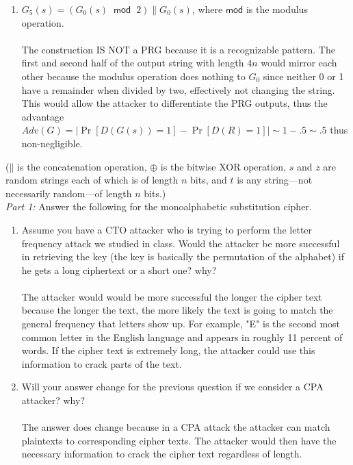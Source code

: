 \documentclass[12pt]{article}
\newcommand*\concat{\mathbin{\|}}
\begin{document}
\begin{enumerate}
\item $G_5(s) = (G_0(s) \;\; \mathsf{mod} \;\; 2) \concat G_0(s)$, where $\mathsf{mod}$ is the modulus operation.
\\\\The construction IS NOT a PRG because it is a recognizable pattern. The first and second half of the output 
string with length \(4n\) would mirror each other because the modulus operation does nothing to \(G_0\) since neither 
0 or 1 have a remainder when divided by two, effectively not changing the string. This would allow the attacker to 
differentiate the PRG outputs, thus the advantage 
\({Adv}(G) = \left| \Pr[D(G(s)) = 1] - \Pr[D(R) = 1] \right| \sim 1-.5 \sim .5\) thus non-negligible.

\end{enumerate} 
($\concat$ is the concatenation operation, $\oplus$ is the bitwise XOR operation, $s$ and $z$ are random strings each of which is of length $n$ bits, and $t$ is any string---not necessarily random---of length $n$ bits.)\\


\newpage
{}
\noindent\emph{Part 1:} Answer the following for the monoalphabetic substitution cipher.
\begin{enumerate}
\item Assume you have a CTO attacker who is trying to perform the letter frequency attack we studied in class. Would the attacker be more successful in retrieving the key (the key is basically the permutation of the alphabet) if he gets a long ciphertext or a short one? why? 
\\\\The attacker would would be more successful the longer the cipher text because the longer the text, the 
more likely the text is going to match the general frequency that letters show up. For example, "E" is the second
most common letter in the English language and appears in roughly 11 percent of words. If the cipher text is extremely long,
the attacker could use this information to crack parts of the text. 
\item Will your answer change for the previous question if we consider a CPA attacker? why?
\\\\The answer does change because in a CPA attack the attacker can match plaintexts to corresponding cipher texts. The 
attacker would then have the necessary information to crack the cipher text regardless of length.
\end{enumerate}
\end{document}
